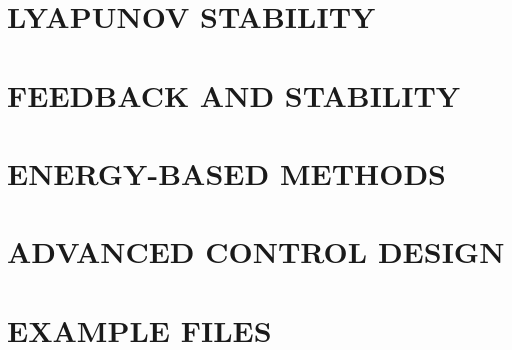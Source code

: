 \documentclass[
	11pt, %
	fleqn, %
	a4paper, %
]{LegrandOrangeBook}
\begin{document}
\part{LYAPUNOV STABILITY}



\part{FEEDBACK AND STABILITY}




\part{ENERGY-BASED METHODS}
 


\part{ADVANCED CONTROL DESIGN}



\part{EXAMPLE FILES}





\stopcontents[part] %




\end{document}
